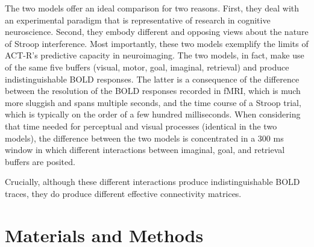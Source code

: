 \documentclass[10pt,letterpaper]{article}
\begin{document}
The two models offer an ideal comparison for two reasons. First, they deal with an experimental paradigm that is representative of research in cognitive neuroscience. Second, they embody different and opposing views about the nature of Stroop interference. Most importantly, these two models exemplify the limits of ACT-R's predictive capacity in neuroimaging. The two models, in fact, make use of the same five buffers (visual, motor, goal, imaginal, retrieval) and produce indistinguishable BOLD responses. The latter is a consequence of the difference between the resolution of the BOLD responses recorded in fMRI, which is much more sluggish and spans multiple seconds, and the time course of a Stroop trial, which is typically on the order of a few hundred milliseconds. When considering that time needed for perceptual and visual processes (identical in the two models), the difference between the two models is concentrated in a 300 ms window in which different interactions between imaginal, goal, and retrieval buffers are posited.

Crucially, although these different interactions produce indistinguishable BOLD traces, they do produce different effective connectivity matrices.


\section{Materials and Methods}
\end{document}
